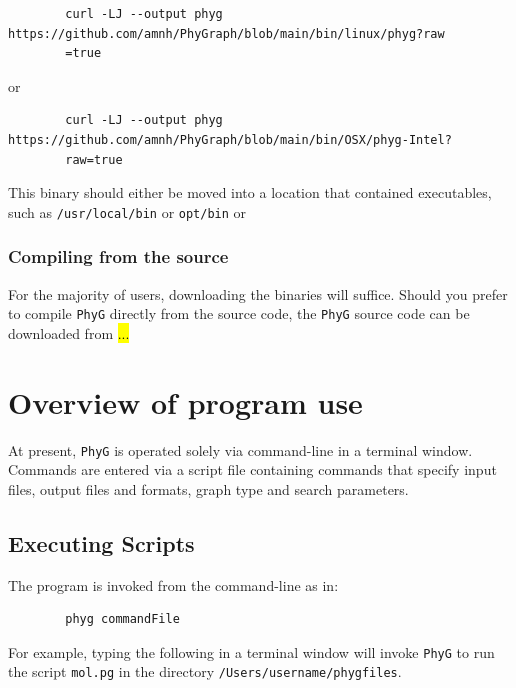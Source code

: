 \documentclass[11pt]{book}
\newcommand{\phyg}{\texttt{PhyG} }
\begin{document}
{{		\begin {verbatim}
		curl -LJ --output phyg https://github.com/amnh/PhyGraph/blob/main/bin/linux/phyg?raw
		=true
		\end{verbatim}
		
		\noindent or 
		
		\begin {verbatim}
		curl -LJ --output phyg https://github.com/amnh/PhyGraph/blob/main/bin/OSX/phyg-Intel?
		raw=true
		\end{verbatim}		
		
		This binary should either be moved into  a location that contained executables, such as 
		\texttt{/usr/local/bin} or \texttt{opt/bin} or
		
		
		\subsubsection{Compiling from the source}
		For the majority of users, downloading the binaries will suffice. Should you prefer to 
		compile \phyg directly from the source code, the \phyg source code can be downloaded 
		from  \hl{...}
		
		
		
		
		
	\section{Overview of program use}
	
		At present, \phyg  is operated solely via command-line in a terminal window. Commands 
		are entered via a script file containing commands that specify input files, output files and 
		formats, graph type and search parameters.
		
		\subsection{Executing Scripts}
		The program is invoked from the command-line as in:
		
		\begin{verbatim}
		phyg commandFile
		\end{verbatim}
		
		\noindent For example, typing the following in a terminal window will invoke  \phyg 
		to run the script \texttt{mol.pg} in the directory \texttt{/Users/username/phygfiles}. 
		
}}
\end{document}
